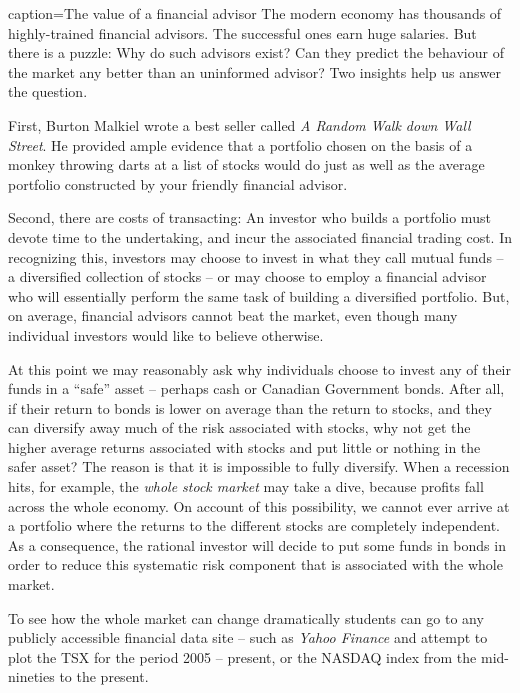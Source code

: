 \newhtmlpage

\begin{ApplicationBox}{caption={The value of a financial advisor \label{app:finadvisor}}}
	The modern economy has thousands of highly-trained financial advisors. The successful ones earn huge salaries. But there is a puzzle: Why do such advisors exist? Can they predict the behaviour of the market any better than an uninformed advisor? Two insights help us answer the question.
	
	First, Burton Malkiel wrote a best seller called \textit{A Random Walk down Wall Street}. He provided ample evidence that a portfolio chosen on the basis of a monkey throwing darts at a list of stocks would do just as well as the average portfolio constructed by your friendly financial advisor.
	
	Second, there are costs of transacting: An investor who builds a portfolio must devote time to the undertaking, and incur the associated financial trading cost. In recognizing this, investors may choose to invest in what they call mutual funds -- a diversified collection of stocks -- or may choose to employ a financial advisor who will essentially perform the same task of building a diversified portfolio. But, on average, financial advisors cannot beat the market, even though many individual investors would like to believe otherwise.
\end{ApplicationBox}

\newhtmlpage

At this point we may reasonably ask why individuals choose to invest any of
their funds in a ``safe'' asset -- perhaps
cash or Canadian Government bonds. After all, if their return to bonds is
lower on average than the return to stocks, and they can diversify away much
of the risk associated with stocks, why not get the higher average returns
associated with stocks and put little or nothing in the safer asset? The
reason is that it is impossible to fully diversify. When a recession hits,
for example, the \textit{whole stock market} may take a dive, because
profits fall across the whole economy. On account of this possibility, we
cannot ever arrive at a portfolio where the returns to the different stocks
are completely independent. As a consequence, the rational investor will
decide to put some funds in bonds in order to reduce this systematic risk
component that is associated with the whole market.

To see how the whole market can change dramatically students can go to any
publicly accessible financial data site -- such as \textit{Yahoo Finance}
and attempt to plot the TSX for the period 2005 -- present, or the NASDAQ
index from the mid-nineties to the present.

